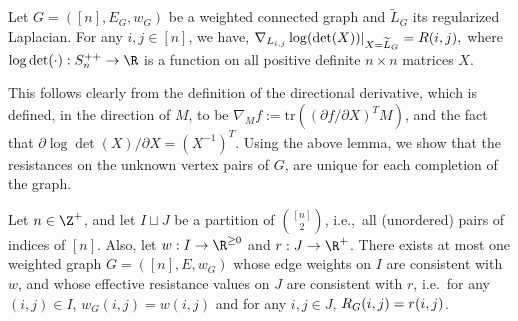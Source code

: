 \begin{lemma}
    \label{lem:derivitive_in_edge_lap_direction}
    Let $G=([n], E_G, w_G)$ be a weighted connected graph and $\widetilde{L}_G$ its regularized Laplacian.  
    For any $i,j\in [n]$, we have,
    \(
        \nabla_{L_{i,j}} \log(\det(X))|_{X = \widetilde{L}_G} = R(i,j),
    \)
    where $\log\det(\cdot):S_n^{++}\rightarrow \R$ is a function on all positive definite $n\times n$ matrices $X$.
\end{lemma}
{
This follows clearly from the definition of the directional derivative, which is defined, in the direction of $M$, to be $\nabla_Mf:=\text{tr}((\partial f/\partial X)^TM)$, and the fact that $\partial \log \det(X) / \partial X = (X^{-1})^T$. Using the above lemma, we show that the resistances on the unknown vertex pairs of $G$, are unique for each completion of the graph.
}
{}
\begin{theorem}
    \label{thm:unique-graph-completion-k-unknowns}
    Let $n\in\Z^+$, and let $I\sqcup J$ be a partition of $\binom{[n]}{2}$, i.e.,~all (unordered) pairs of indices of $[n]$.
    Also, let $w:I\rightarrow \R^{\geq 0}$ and $r:J\rightarrow \R^+$.
    There exists at most one %
    weighted graph $G=([n], E, w_G)$ whose edge weights on $I$ are consistent with $w$, and whose effective resistance values on $J$ are consistent with $r$, i.e.~for any $(i,j)\in I$, $w_G(i,j) = w(i, j)$ and for any $i,j\in J$, $R_G(i,j) = r(i,j)$.
\end{theorem}
